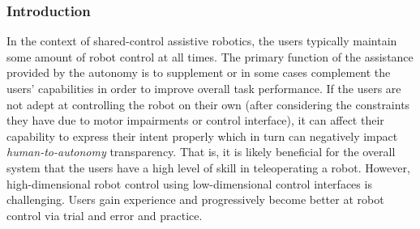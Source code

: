 \documentclass[12pt]{article}
\begin{document}
\subsubsection{Introduction}

In the context of shared-control assistive robotics, the users typically maintain some amount of robot control at all times. The primary function of the assistance provided by the autonomy is to supplement or in some cases complement the users' capabilities in order to improve overall task performance. If the users are not adept at controlling the robot on their own (after considering the constraints they have due to motor impairments or control interface), it can affect their capability to express their intent properly which in turn can negatively impact \textit{human-to-autonomy} transparency. That is, it is likely beneficial for the overall system that the users have a high level of skill in teleoperating a robot. 
However, high-dimensional robot control using low-dimensional control interfaces is challenging. Users gain experience and progressively become better at robot control via trial and error and practice. 


%
%
%

\end{document}
